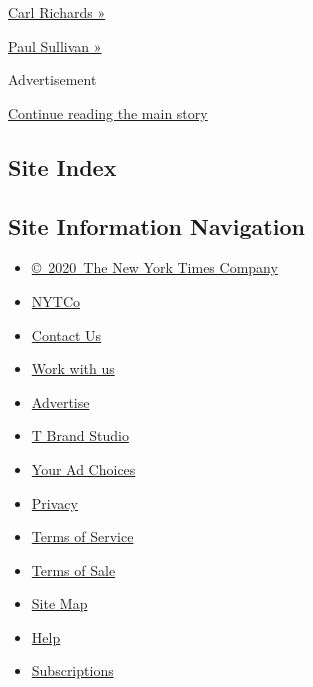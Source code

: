 \href{https://www.nytimes3xbfgragh.onion/by/carl-richards}{Carl Richards
»}

\href{https://www.nytimes3xbfgragh.onion/column/wealth-matters}{Paul
Sullivan »}

Advertisement

\protect\hyperlink{after-mktg}{Continue reading the main story}

\hypertarget{site-index}{%
\subsection{Site Index}\label{site-index}}

\hypertarget{site-information-navigation}{%
\subsection{Site Information
Navigation}\label{site-information-navigation}}

\begin{itemize}
\tightlist
\item
  \href{https://help.nytimes3xbfgragh.onion/hc/en-us/articles/115014792127-Copyright-notice}{©~2020~The
  New York Times Company}
\end{itemize}

\begin{itemize}
\tightlist
\item
  \href{https://www.nytco.com/}{NYTCo}
\item
  \href{https://help.nytimes3xbfgragh.onion/hc/en-us/articles/115015385887-Contact-Us}{Contact
  Us}
\item
  \href{https://www.nytco.com/careers/}{Work with us}
\item
  \href{https://nytmediakit.com/}{Advertise}
\item
  \href{http://www.tbrandstudio.com/}{T Brand Studio}
\item
  \href{https://www.nytimes3xbfgragh.onion/privacy/cookie-policy\#how-do-i-manage-trackers}{Your
  Ad Choices}
\item
  \href{https://www.nytimes3xbfgragh.onion/privacy}{Privacy}
\item
  \href{https://help.nytimes3xbfgragh.onion/hc/en-us/articles/115014893428-Terms-of-service}{Terms
  of Service}
\item
  \href{https://help.nytimes3xbfgragh.onion/hc/en-us/articles/115014893968-Terms-of-sale}{Terms
  of Sale}
\item
  \href{https://spiderbites.nytimes3xbfgragh.onion}{Site Map}
\item
  \href{https://help.nytimes3xbfgragh.onion/hc/en-us}{Help}
\item
  \href{https://www.nytimes3xbfgragh.onion/subscription?campaignId=37WXW}{Subscriptions}
\end{itemize}
